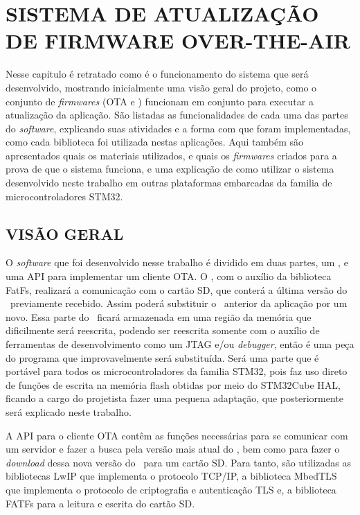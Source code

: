 
\chapter{SISTEMA DE ATUALIZAÇÃO DE FIRMWARE OVER-THE-AIR}
\label{chap:metodologia}
Nesse capitulo é retratado como é o funcionamento do sistema que será desenvolvido, mostrando inicialmente uma visão geral do projeto, como o conjunto de \textit{firmwares} (OTA e \bootloader) funcionam em conjunto para executar a atualização da aplicação. São listadas as funcionalidades de cada uma das partes do \textit{software}, explicando suas atividades e a forma com que foram implementadas, como cada biblioteca foi utilizada nestas aplicações. Aqui também são apresentados quais os materiais utilizados, e quais os \textit{firmwares} criados para a prova de que o sistema funciona, e uma explicação de como utilizar o sistema desenvolvido neste trabalho em outras plataformas embarcadas da familia de microcontroladores STM32.

\section{VISÃO GERAL}
O \textit{software} que foi desenvolvido nesse trabalho é dividido em duas partes, um \bootloader, e uma API para implementar um cliente OTA. O \bootloader, com o auxílio da biblioteca FatFs, realizará a comunicação com o cartão SD, que conterá a última versão do \firmware\ previamente recebido. Assim poderá substituir o \software\ anterior da aplicação por um novo. Essa parte do \software\ ficará armazenada em uma região da memória que dificilmente será reescrita, podendo ser reescrita somente com o auxílio de ferramentas de desenvolvimento como um JTAG e/ou \textit{debugger}, então é uma peça do programa que improvavelmente será substituída. Será uma parte que é portável para todos os microcontroladores da familia STM32, pois faz uso direto de funções de escrita na memória flash obtidas por meio do STM32Cube HAL, ficando a cargo do projetista fazer uma pequena adaptação, que posteriormente será explicado neste trabalho.

A API para o cliente OTA contêm as funções necessárias para se comunicar com um servidor e fazer a busca pela versão mais atual do \firmware, bem como para fazer o \textit{download} dessa nova versão do \firmware\ para um cartão SD. Para tanto, são utilizadas as bibliotecas LwIP que implementa o protocolo TCP/IP, a biblioteca MbedTLS que implementa o protocolo de criptografia e autenticação TLS e, a biblioteca FATFs para a leitura e escrita do cartão SD.

